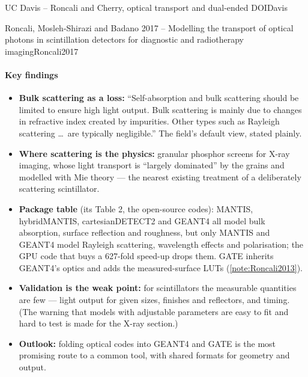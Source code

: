 \begin{programnote}{UC Davis -- Roncali and Cherry, optical transport and dual-ended DOI}{Davis}
\begin{papernote}{Roncali, Mosleh-Shirazi and Badano 2017 -- Modelling the transport of optical photons in scintillation detectors for diagnostic and radiotherapy imaging}{Roncali2017}
\paragraph{Key findings}
\begin{itemize}
	\item \textbf{Bulk scattering as a loss:} ``Self-absorption and bulk
		scattering should be limited to ensure high light output. Bulk
		scattering is mainly due to changes in refractive index created by
		impurities. Other types such as Rayleigh scattering \ldots\ are
		typically negligible.'' The field's default view, stated plainly.
	\item \textbf{Where scattering is the physics:} granular phosphor screens
		for X-ray imaging, whose light transport is ``largely dominated'' by
		the grains and modelled with Mie theory --- the nearest existing
		treatment of a deliberately scattering scintillator.
	\item \textbf{Package table} (its Table 2, the open-source codes):
		MANTIS, hybridMANTIS, cartesianDETECT2 and GEANT4 all model bulk
		absorption, surface reflection and roughness, but only MANTIS and
		GEANT4 model Rayleigh scattering, wavelength effects and
		polarisation; the GPU code that buys a 627-fold speed-up drops them.
		GATE inherits GEANT4's optics and adds the measured-surface LUTs
		(\ref{note:Roncali2013}).
	\item \textbf{Validation is the weak point:} for scintillators the
		measurable quantities are few --- light output for given sizes,
		finishes and reflectors, and timing. (The warning that models with
		adjustable parameters are easy to fit and hard to test is made for the
		X-ray section.)
	\item \textbf{Outlook:} folding optical codes into GEANT4 and GATE is
		the most promising route to a common tool, with shared formats for
		geometry and output.
\end{itemize}


\end{papernote}
\end{programnote}
